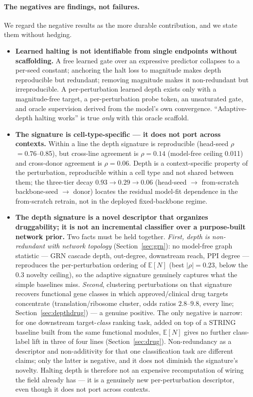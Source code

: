 \documentclass[11pt]{article}
\newcommand{\EN}{\ensuremath{\mathbb{E}[N]}}
\let\mathrho\rho
\renewcommand{\rho}{\ensuremath{\mathrho}}
\begin{document}
\paragraph{The negatives are findings, not failures.} We regard the negative results as the more
durable contribution, and we state them without hedging.
\begin{itemize}[leftmargin=1.4em,itemsep=2pt]
\item \textbf{Learned halting is not identifiable from single endpoints without scaffolding.} A
free learned gate over an expressive predictor collapses to a per-seed constant; anchoring the
halt loss to magnitude makes depth reproducible but redundant; removing magnitude makes it
non-redundant but irreproducible. A per-perturbation learned depth exists only with a
magnitude-free target, a per-perturbation probe token, an unsaturated gate, and oracle supervision
derived from the model's own convergence. ``Adaptive-depth halting works'' is true \emph{only}
with this oracle scaffold.
\item \textbf{The signature is cell-type-specific --- it does not port across contexts.}
Within a line the depth signature is reproducible (head-seed \rho{}$=0.76$--0.85), but cross-line
agreement is \rho{}$=0.14$ (model-free ceiling 0.011) and cross-donor agreement is \rho{}$=0.06$.
Depth is a context-specific property of the perturbation, reproducible within a cell type and not
shared between them; the three-tier decay $0.93\!\rightarrow\!0.29\!\rightarrow\!0.06$ (head-seed
$\rightarrow$ from-scratch backbone-seed $\rightarrow$ donor) locates the residual model-fit
dependence in the from-scratch retrain, not in the deployed fixed-backbone regime.
\item \textbf{The depth signature is a novel descriptor that organizes druggability; it is not an
incremental classifier over a purpose-built network prior.} Two facts must be held together.
\emph{First, depth is non-redundant with network topology} (Section~\ref{sec:grn}): no model-free
graph statistic --- GRN cascade depth, out-degree, downstream reach, PPI degree --- reproduces the
per-perturbation ordering of \EN{} (best $|\rho|=0.23$, below the $0.3$ novelty ceiling), so the
adaptive signature genuinely captures what the simple baselines miss. \emph{Second}, clustering
perturbations on that signature recovers functional gene classes in which approved/clinical drug
targets concentrate (translation/ribosome cluster, odds ratios $2.8$--$9.8$, every line;
Section~\ref{sec:depthdrug}) --- a genuine positive. The only negative is narrow: for one downstream
target-\emph{class} ranking task, added on top of a STRING baseline built from the same functional
modules, \EN{} gives no further class-label lift in three of four lines (Section~\ref{sec:drug}).
Non-redundancy as a descriptor and non-additivity for that one classification task are different
claims; only the latter is negative, and it does not diminish the signature's novelty. Halting depth
is therefore not an expensive recomputation of wiring the field already has --- it is a genuinely new
per-perturbation descriptor, even though it does not port across contexts.
\end{itemize}
\end{document}
